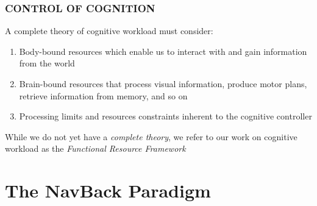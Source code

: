 \documentclass{beamer}
\begin{document}
\begin{frame}
	\frametitle{CONTROL OF COGNITION}
		A complete theory of cognitive workload must consider: 
		\begin{enumerate}[<+-| alert@+>]
			\item Body-bound resources which enable us to interact with and gain information from the world
			\item Brain-bound resources that process visual information, produce motor plans, retrieve information from memory, and so on
			\item Processing limits and resources constraints inherent to the cognitive controller
		\end{enumerate}
		\pause
		While we do not yet have a \emph{complete theory}, we refer to our work on cognitive workload as the \emph{Functional Resource Framework}

\end{frame}

\section{The NavBack Paradigm}
\end{document}
